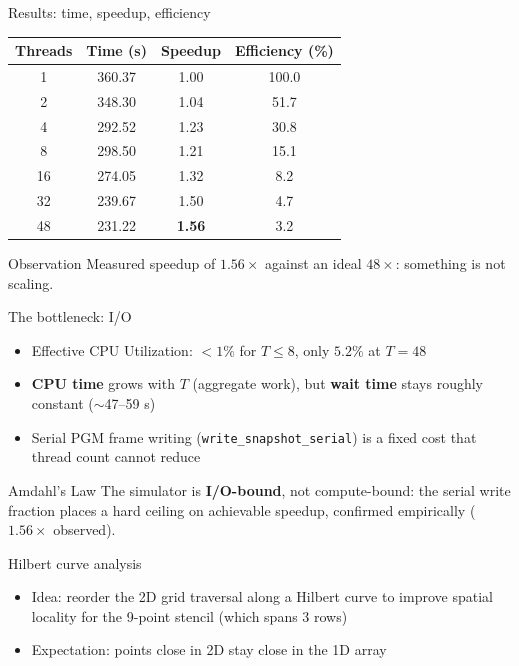 \documentclass[11pt,aspectratio=169]{beamer}
\begin{document}
\begin{frame}{Results: time, speedup, efficiency}
  \begin{table}
    \centering\small
    \begin{tabular}{cccc}
      \toprule
      Threads & Time (s) & Speedup & Efficiency (\%) \\
      \midrule
      1  & 360.37 & 1.00 & 100.0 \\
      2  & 348.30 & 1.04 & 51.7 \\
      4  & 292.52 & 1.23 & 30.8 \\
      8  & 298.50 & 1.21 & 15.1 \\
      16 & 274.05 & 1.32 & 8.2 \\
      32 & 239.67 & 1.50 & 4.7 \\
      48 & 231.22 & \textbf{1.56} & 3.2 \\
      \bottomrule
    \end{tabular}
  \end{table}
  \begin{alertblock}{Observation}
    Measured speedup of $1.56\times$ against an ideal $48\times$:
    something is not scaling.
  \end{alertblock}
\end{frame}

\begin{frame}{The bottleneck: I/O}
  \begin{itemize}
    \item Effective CPU Utilization: $<1\%$ for $T\le 8$, only $5.2\%$ at $T=48$
    \item \textbf{CPU time} grows with $T$ (aggregate work), but
      \textbf{wait time} stays roughly constant ($\sim$47--59 s)
    \item Serial PGM frame writing (\texttt{write\_snapshot\_serial})
      is a fixed cost that thread count cannot reduce
  \end{itemize}
  \begin{block}{Amdahl's Law}
    The simulator is \textbf{I/O-bound}, not compute-bound: the serial
    write fraction places a hard ceiling on achievable speedup,
    confirmed empirically ($1.56\times$ observed).
  \end{block}
\end{frame}

\begin{frame}{Hilbert curve analysis}

  \begin{itemize}
    \item Idea: reorder the 2D grid traversal along a Hilbert curve
      to improve spatial locality for the 9-point stencil
      (which spans 3 rows)
    \item Expectation: points close in 2D stay close in the 1D array
  \end{itemize}
  \begin{figure}
    \centering
    \scalebox{0.8}{}
  \end{figure}

\end{frame}
\end{document}

